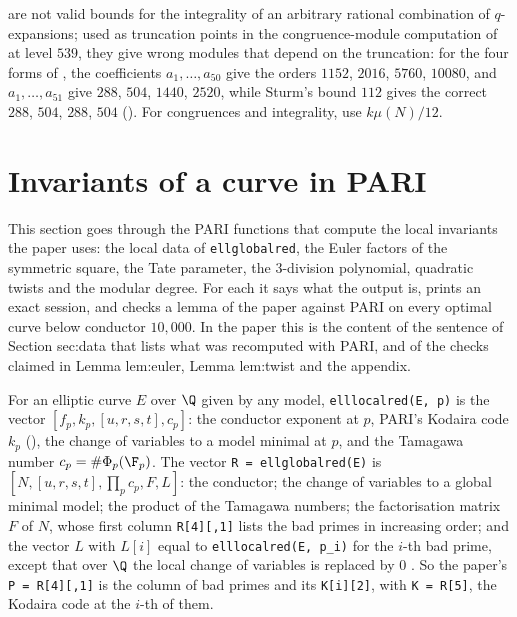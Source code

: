 \begin{sloppypar}
\begin{warning}[pitfalls]
\begin{enumerate}[label=(\alph*)]
are not valid bounds for the integrality of an arbitrary rational combination of $q$-expansions; used as truncation points in the
congruence-module computation of  at level $539$, they give wrong modules that depend on the truncation: for the four forms of
, the coefficients $a_1,\dots,a_{50}$ give the orders $1152$, $2016$, $5760$, $10080$, and $a_1,\dots,a_{51}$ give $288$, $504$, $1440$, $2520$,
while Sturm's bound $112$ gives the correct $288$, $504$, $288$, $504$ (). For congruences and integrality, use $k\mu(N)/12$.
\end{enumerate}
\end{warning}
\section{Invariants of a curve in PARI}\label{sec:computation:invariants}

This section goes through the PARI functions that compute the local invariants the paper uses: the local data of \texttt{ellglobalred}, the
Euler factors of the symmetric square, the Tate parameter, the $3$-division polynomial, quadratic twists and the modular degree. For each it
says what the output is, prints an exact session, and checks a lemma of the paper against PARI on every optimal curve below conductor
$10{,}000$. In the paper this is the content of the sentence of Section sec:data that lists what was recomputed with PARI, and of the checks
claimed in Lemma lem:euler, Lemma lem:twist and the appendix.

\begin{definition}\label{def:computation:ellglobalred}
For an elliptic curve $E$ over $\Q$ given by any model, \texttt{elllocalred(E, p)} is the vector $[f_p,k_p,[u,r,s,t],c_p]$: the conductor
exponent at $p$, PARI's Kodaira code $k_p$ (), the change of variables to a model minimal at $p$, and the
Tamagawa number $c_p=\#\Phi_p(\F_p)$. The vector \texttt{R = ellglobalred(E)} is $[N,[u,r,s,t],\prod_pc_p,F,L]$: the conductor; the change of variables to a
global minimal model; the product of the Tamagawa numbers; the factorisation matrix $F$ of $N$, whose first column \texttt{R[4][,1]} lists the bad primes in
increasing order; and the vector $L$ with $L[i]$ equal to \texttt{elllocalred(E, p\_i)} for the $i$-th bad prime, except that over $\Q$ the
local change of variables is replaced by $0$ \cite{PARIusers}. So the paper's \texttt{P = R[4][,1]} is the column of bad primes and its
\texttt{K[i][2]}, with \texttt{K = R[5]}, the Kodaira code at the $i$-th of them.
\end{definition}


\end{sloppypar}
